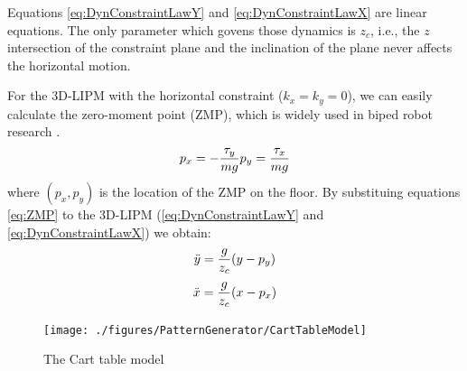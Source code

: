 Equations \ref{eq:DynConstraintLawY} and \ref{eq:DynConstraintLawX} are linear
equations. The only parameter which govens those dynamics is $z_c$, i.e., the
$z$ intersection of the constraint plane and the inclination of the plane never
affects the horizontal motion.
\par
For the 3D-LIPM with the horizontal constraint ($k_x = k_y = 0$), we can easily
calculate the zero-moment point (ZMP), which is widely used in biped robot
research \cite{}.
\begin{equation}
p_x = -\frac{\tau_y}{m g }\\
p_y = \frac{\tau_x}{m g }\\
\label{eq:ZMP}
\end{equation}
where $(p_x,p_y)$ is the location of the ZMP on the floor.
By substituing equations \ref{eq:ZMP} to the 3D-LIPM (\ref{eq:DynConstraintLawY}
and \ref{eq:DynConstraintLawX}) we obtain:
\begin{equation}
\ddot{y} = \frac{g}{z_c}(y-p_y) \\
\label{eq:DynZMPY}
\end{equation}
\begin{equation}
\ddot{x} = \frac{g}{z_c}(x-p_x) \\
\label{eq:DynZMPX}
\end{equation}
\begin{figure}[htb]
\begin{center}
\texttt{[image: ./figures/PatternGenerator/CartTableModel]}
\caption{The Cart table model}
\label{pic:CartTableModel}
\end{center}
\end{figure}


